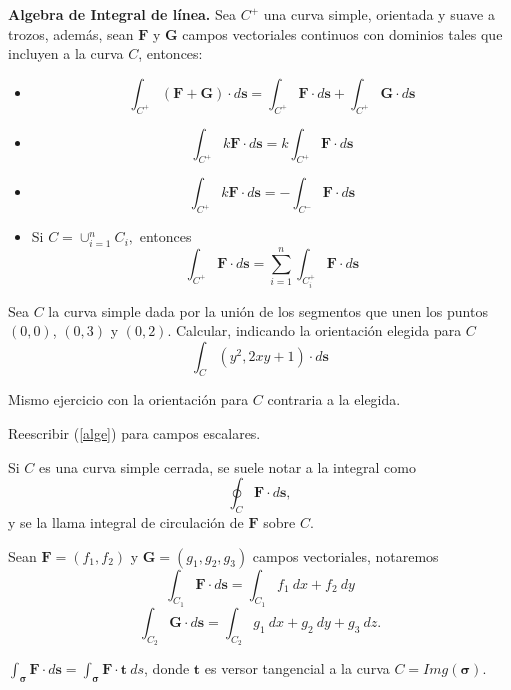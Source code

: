 


  \begin{propertie} \textbf{Algebra de Integral de l\'inea.}\label{alge} Sea $C^{+}$ una curva simple, orientada y suave a trozos, adem\'as,  sean  $\mathbf{F}$ y $\mathbf{G}$ campos vectoriales continuos con dominios tales que incluyen a la curva $C$, entonces: 
\begin{itemize}
\item[1.]  \[
        \int_{C^{+}}(\mathbf{F} + \mathbf{G})  \cdot d\mathbf{s}=  \int_{C^{+}} \mathbf{F} \cdot d\mathbf{s}  +  \int_{C^{+}} \mathbf{G}  \cdot d\mathbf{s} 
    \]

\item[2.]  \[
        \int_{C^{+}} k \mathbf{F}  \cdot d\mathbf{s}= k \int_{C^{+}} \mathbf{F} \cdot d\mathbf{s}   
    \]

\item[3.]  \[
        \int_{C^{+}} k \mathbf{F}  \cdot d\mathbf{s}= - \int_{C^{-}} \mathbf{F} \cdot d\mathbf{s}   
    \]

\item[3.]  Si $C = \cup_{i=1}^{n} C_{i},$ entonces \[
        \int_{C^{+}}  \mathbf{F}  \cdot d\mathbf{s}=  \sum_{i=1}^{n}  \int_{C_{i}^{+}} \mathbf{F} \cdot d\mathbf{s}   
    \]

\end{itemize}
 \end{propertie}



 \begin{tarea} Sea $C$ la curva simple dada por la uni\'on de los segmentos que unen los puntos $(0,0)$,  $(0,3)$ y $(0,2)$. Calcular, indicando la orientaci\'on elegida para $C$  $$ \int_{C}  (y^{2}, 2xy +1)  \cdot d\mathbf{s} $$
 \end{tarea}

 \begin{tarea} Mismo ejercicio con la orientaci\'on para $C$ contraria  a la elegida. 
 \end{tarea}

\begin{tarea}Reescribir  (\ref{alge})  para campos escalares. 
\end{tarea}


\begin{definition}
    Si $C$  es una curva simple cerrada,  se suele notar a la integral como
    \[
        \oint_{C}\mathbf{F}\cdot d\mathbf{s},  
    \]  y se la llama integral de circulaci\'on de $\mathbf{F}$ sobre $C$.
\end{definition}


 \begin{nota}\label{not_int} Sean  $\mathbf{F}=(f_1, f_2)$ y $\mathbf{G}=(g_1, g_2, g_3)$ campos vectoriales, notaremos $$ \int_{C_1}\mathbf{F}\cdot d\mathbf{s} =  \int_{ C_1}f_1\:dx+ f_2 \:dy$$ 
  $$ \int_{C_2}\mathbf{G}\cdot d\mathbf{s} =  \int_{C_2} g_1\:dx+g_2\:dy+g_3\:dz.$$
 \end{nota}
 
 \begin{nota} 
  $\int_{\boldsymbol{\sigma}}\mathbf{F}\cdot d\mathbf{s}=\int_{\boldsymbol{\sigma}}\mathbf{F}\cdot{\mathbf{t}}\:ds$,  donde ${\mathbf{t}}$ es versor tangencial a la curva  $C = Img(\boldsymbol{\sigma}).$
 \end{nota}
